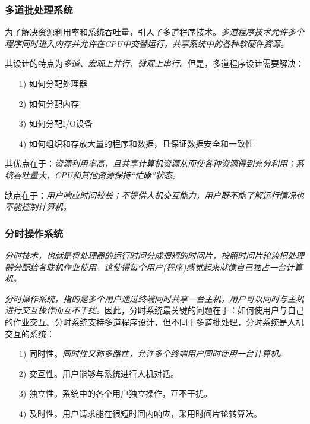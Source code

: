 \subsubsection{多道批处理系统}

    为了解决资源利用率和系统吞吐量，引入了多道程序技术。\emph{多道程序技术允许多个程序同时进入内存并允许在CPU中交替运行，共享系统中的各种软硬件资源。}

    其设计的特点为\emph{多道、{\color{red}宏观上并行，微观上串行。}}但是，多道程序设计需要解决：

\begin{itemize}
    \item [1)] 如何分配处理器
    \item [2)] 如何分配内存
    \item [3)] 如何分配I/O设备
    \item [4)] 如何组织和存放大量的程序和数据，且保证数据安全和一致性
\end{itemize}

    其优点在于：\emph{资源利用率高，且共享计算机资源从而使各种资源得到充分利用；系统吞吐量大，CPU和其他资源保持“忙碌”状态。}

    缺点在于：\emph{用户响应时间较长；不提供人机交互能力，用户既不能了解运行情况也不能控制计算机。}

\subsubsection{分时操作系统}

    \emph{分时技术，也就是将处理器的运行时间分成很短的时间片，按照时间片轮流把处理器分配给各联机作业使用。{\color{red}这使得每个用户(程序)感觉起来就像自己独占一台计算机}。}

    \emph{分时操作系统，指的是多个用户通过终端同时共享一台主机，用户可以同时与主机进行交互操作而互不干扰。}因此，分时系统最关键的问题在于：{\color{red}如何使用户与自己的作业交互}。分时系统支持多道程序设计，但不同于多道批处理，分时系统是人机交互的系统：

\begin{itemize}
    \item [1)] 同时性。\emph{同时性又称多路性，允许多个终端用户同时使用一台计算机。}
    \item [2)] 交互性。用户能够与系统进行人机对话。
    \item [3)] 独立性。系统中的各个用户独立操作，互不干扰。
    \item [4)] 及时性。用户请求能在很短时间内响应，采用时间片轮转算法。
\end{itemize}

